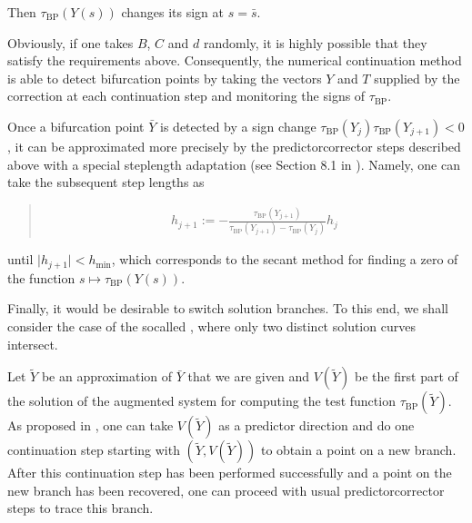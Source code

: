 \documentclass[a4paper,11pt,english]{sphinxmanual}
\begin{document}
Then \(\tau_{\mathrm{BP}}(Y(s))\) changes its sign at \(s = \bar{s}\).

Obviously, if one takes \(B\), \(C\) and \(d\) randomly, it is
highly possible that they satisfy the requirements above. Consequently, the
numerical continuation method is able to detect bifurcation points by
taking the vectors \(Y\) and \(T\) supplied by the correction at each
continuation step and monitoring the signs of \(\tau_{\mathrm{BP}}\).

Once a bifurcation point \(\bar{Y}\) is detected by a sign change
\(\tau_{\mathrm{BP}}(Y_{j}) \tau_{\mathrm{BP}}(Y_{j+1}) < 0\), it can be
approximated more precisely by the predictor\sphinxhyphen{}corrector steps described above
with a special step\sphinxhyphen{}length adaptation (see Section 8.1 in ). Namely,
one can take the subsequent step lengths as
\begin{quote}
\begin{equation*}
\begin{split}h_{j+1} := -\frac{\tau_{\mathrm{BP}}(Y_{j+1})}{\tau_{\mathrm{BP}}(Y_{j+1}) - \tau_{\mathrm{BP}}(Y_{j})}h_{j}\end{split}
\end{equation*}\end{quote}

until \(\lvert h_{j+1} \rvert < h_{\mathrm{min}}\), which corresponds to the
secant method for finding a zero of the function
\(s \mapsto \tau_{\mathrm{BP}}(Y(s))\).

Finally, it would be desirable to switch solution branches. To this end, we
shall consider the case of the so\sphinxhyphen{}called , where only
two distinct solution curves intersect.

Let \(\tilde{Y}\) be an approximation of \(\bar{Y}\) that we are given
and \(V(\tilde{Y})\) be the first part of the solution of the augmented
system for computing the test function \(\tau_{\mathrm{BP}}(\tilde{Y})\). As
proposed in , one can take \(V(\tilde{Y})\) as a predictor
direction and do one continuation step starting with
\((\tilde{Y}, V(\tilde{Y}))\) to obtain a point on a new branch. After this
continuation step has been performed successfully and a point on the new branch
has been recovered, one can proceed with usual predictor\sphinxhyphen{}corrector steps to
trace this branch.
\end{document}
